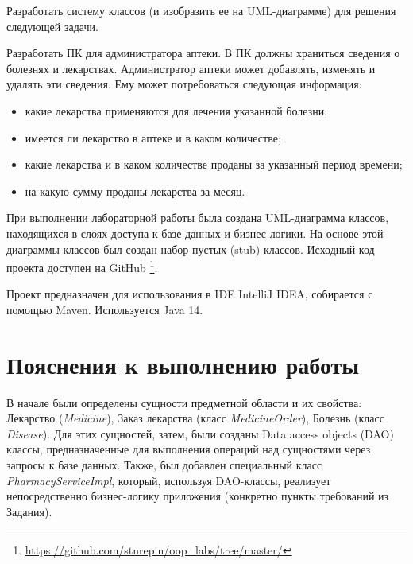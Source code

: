 \documentclass[a4paper,14pt]{extarticle}
\newcommand{\Code}[1]{\textit{#1}}
\begin{document}


\renewcommand*{\thepage}{}
\tableofcontents
\clearpage
\renewcommand*{\thepage}{\arabic{page}}

\setcounter{page}{3}


Разработать систему классов (и изобразить ее на UML-диаграмме) для решения
следующей задачи.


Разработать ПК для администратора аптеки. В ПК должны
храниться сведения о болезнях и лекарствах. Администратор аптеки может
добавлять, изменять и удалять эти сведения. Ему может потребоваться
следующая информация:
\begin{itemize}
    \item какие лекарства применяются для лечения указанной болезни;
    \item имеется ли лекарство в аптеке и в каком количестве;
    \item какие лекарства и в каком количестве проданы за указанный период
        времени;
    \item на какую сумму проданы лекарства за месяц.
\end{itemize}


При выполнении лабораторной работы была создана UML-диаграмма классов,
находящихся в слоях доступа к базе данных и бизнес-логики.
На основе этой диаграммы классов был создан набор пустых (stub) классов.
Исходный код проекта доступен на GitHub
\footnote{\url{https://github.com/stnrepin/oop_labs/tree/master/}}.

Проект предназначен для использования в IDE IntelliJ IDEA, собирается с помощью
Maven. Используется Java 14.

\clearpage


\section{Пояснения к выполнению работы}

В начале были определены сущности предметной области и их свойства: Лекарство
(\Code{Medicine}), Заказ лекарства (класс \Code{MedicineOrder}), Болезнь (класс
\Code{Disease}). Для этих сущностей, затем, были созданы Data access objects
(DAO) классы, предназначенные для выполнения операций над сущностями через
запросы к базе данных. Также, был добавлен специальный класс
\Code{PharmacyServiceImpl}, который, используя DAO-классы, реализует
непосредственно бизнес-логику приложения (конкретно пункты требований из
Задания).
\end{document}
